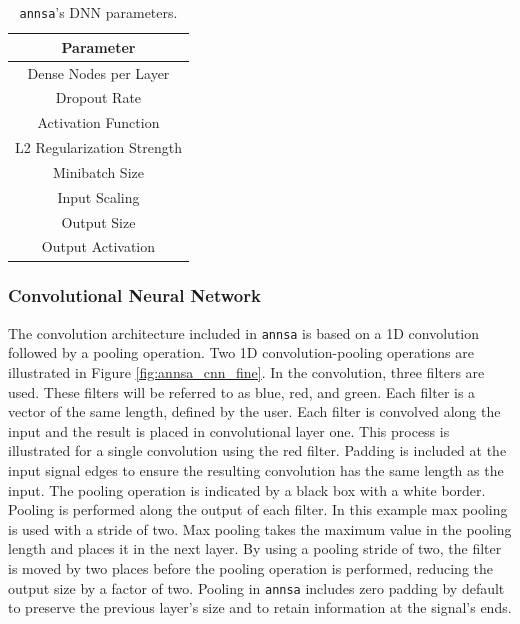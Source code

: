 \begin{table}[H]
\centering
\caption{\texttt{annsa}'s DNN parameters.}
\begin{tabular}{c}
\hline
Parameter \\ \hline
Dense Nodes per Layer \\
Dropout Rate \\
Activation Function \\
L2 Regularization Strength \\ 
Minibatch Size \\ 
Input Scaling \\
Output Size \\
Output Activation \\ \hline
\end{tabular}
\label{table:annsa_dnn_params}
\end{table}

\subsubsection{Convolutional Neural Network} \label{annsa_section_conv_neural_network}

The convolution architecture included in \verb|annsa| is based on a 1D convolution followed by a pooling operation. Two 1D convolution-pooling operations are illustrated in Figure \ref{fig:annsa_cnn_fine}. In the convolution, three filters are used. These filters will be referred to as blue, red, and green. Each filter is a vector of the same length, defined by the user. Each filter is convolved along the input and the result is placed in convolutional layer one. This process is illustrated for a single convolution using the red filter. Padding is included at the input signal edges to ensure the resulting convolution has the same length as the input. The pooling operation is indicated by a black box with a white border. Pooling is performed along the output of each filter. In this example max pooling is used with a stride of two. Max pooling takes the maximum value in the pooling length and places it in the next layer. By using a pooling stride of two, the filter is moved by two places before the pooling operation is performed, reducing the output size by a factor of two. Pooling in \verb|annsa| includes zero padding by default to preserve the previous layer's size and to retain information at the signal's ends.

